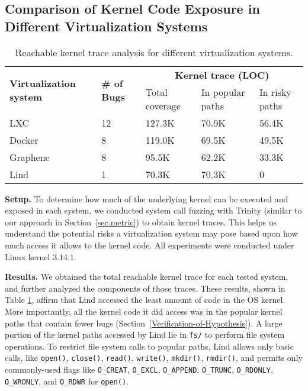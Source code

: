 {{{\subsection{Comparison of Kernel Code Exposure in Different Virtualization
Systems}
\label{Reachable-Kernel-Trace-Analysis-for-Different-Virtualization-Systems}
\begin{table}
\centering
\scriptsize
\begin{tabular}{|l|l|l|l|l|}
  \hline
  \multirow{3}{1.5cm}{\bf Virtualization system} & \multirow{3}{0.5cm}{\bf \# of Bugs} & \multicolumn{3}{c|}{\bf Kernel trace (LOC)} \\ \cline{3-5}
  & & \multirow{2}{1.2cm}{Total coverage} & \multirow{2}{1.2cm}{In popular paths} & \multirow{2}{1.2cm}{In risky paths}  \\
  & & & & \\  \hline
  LXC & 12 & 127.3K & 70.9K & 56.4K \\
  \hline
  Docker & 8 & 119.0K & 69.5K & 49.5K \\
  \hline
  Graphene & 8 & 95.5K & 62.2K & 33.3K \\
  \hline
  Lind & 1 & 70.3K & 70.3K & 0 \\
  \hline
\end{tabular}
\caption{\small Reachable kernel trace analysis for different virtualization
systems.}
\label{table:trace-systems}
\end{table}


\noindent
\textbf{Setup.}
To determine how much of the underlying kernel can be executed and exposed in
each system,
we conducted system call fuzzing with Trinity (similar to our approach in
Section~{\ref{sec.metric}}) to obtain
kernel traces. This helps us understand the potential risks a virtualization system
may pose based upon how much access it allows to the kernel code.
All experiments were conducted under Linux kernel 3.14.1.

\noindent
\textbf{Results.}
We obtained the total reachable kernel trace for
each tested system,
and further analyzed the components of those traces. These results,
shown in Table \ref{table:trace-systems}, affirm that Lind accessed the
least amount of code in the OS
kernel. More importantly, all the kernel code it did access was in the
popular kernel paths that contain fewer bugs (Section~{\ref{Verification-of-Hypothesis}}).
A large portion of the kernel paths accessed by Lind lie in
\texttt{fs/} to perform file system operations.
To restrict file system calls to popular paths, Lind allows only basic calls,
like \texttt{open()}, \texttt{close()}, \texttt{read()}, \texttt{write()}, \texttt{mkdir()},
\texttt{rmdir()}, and permits only commonly-used flags like \texttt{O\_CREAT}, \texttt{O\_EXCL},
 \texttt{O\_APPEND}, \texttt{O\_TRUNC},
\texttt{O\_RDONLY}, \texttt{O\_WRONLY}, and \texttt{O\_RDWR}
for \texttt{open()}.

}}}
